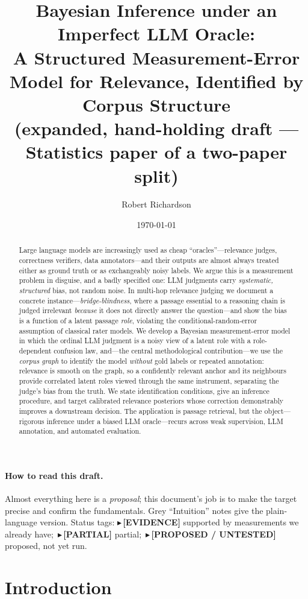 \documentclass[11pt]{article}
\title{\textbf{Bayesian Inference under an Imperfect LLM Oracle:\\ A Structured Measurement-Error Model for
Relevance, Identified by Corpus Structure}\\[4pt]
\large\normalfont(expanded, hand-holding draft --- Statistics paper of a two-paper split)}
\author{Robert Richardson}
\date{\today}
\newcommand{\TESTED}[1]{{\color{teal}\small$\blacktriangleright$\,\textbf{[EVIDENCE]} #1}}
\newcommand{\PARTIAL}[1]{{\color{orange}\small$\blacktriangleright$\,\textbf{[PARTIAL]} #1}}
\newcommand{\PROP}[1]{{\color{violet}\small$\blacktriangleright$\,\textbf{[PROPOSED / UNTESTED]} #1}}
\begin{document}
\maketitle

\begin{abstract}
Large language models are increasingly used as cheap ``oracles''---relevance judges, correctness verifiers,
data annotators---and their outputs are almost always treated either as ground truth or as exchangeably noisy
labels. We argue this is a measurement problem in disguise, and a badly specified one: LLM judgments carry
\emph{systematic, structured} bias, not random noise. In multi-hop relevance judging we document a concrete
instance---\emph{bridge-blindness}, where a passage essential to a reasoning chain is judged irrelevant
\emph{because} it does not directly answer the question---and show the bias is a function of a latent passage
\emph{role}, violating the conditional-random-error assumption of classical rater models. We develop a Bayesian
measurement-error model in which the ordinal LLM judgment is a noisy view of a latent role with a role-dependent
confusion law, and---the central methodological contribution---we use the \emph{corpus graph} to identify the
model \emph{without} gold labels or repeated annotation: relevance is smooth on the graph, so a confidently
relevant anchor and its neighbours provide correlated latent roles viewed through the same instrument,
separating the judge's bias from the truth. We state identification conditions, give an inference procedure,
and target calibrated relevance posteriors whose correction demonstrably improves a downstream decision. The
application is passage retrieval, but the object---rigorous inference under a biased LLM oracle---recurs across
weak supervision, LLM annotation, and automated evaluation.
\end{abstract}

\paragraph{How to read this draft.} Almost everything here is a \emph{proposal}; this document's job is to make
the target precise and confirm the fundamentals. Grey ``Intuition'' notes give the plain-language version.
Status tags: \TESTED{} supported by measurements we already have;\ \PARTIAL{} partial;\ \PROP{} proposed, not
yet run.

\tableofcontents

\section{Introduction}
\end{document}
